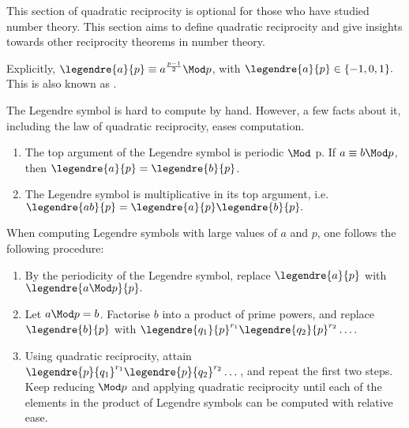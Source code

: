 \documentclass[a4paper, 12pt,oneside,openany]{book}
\begin{document}
This section of quadratic reciprocity is optional for those who have studied number theory. This section aims to define quadratic reciprocity and give insights towards other reciprocity theorems in number theory. 



Explicitly, $\legendre{a}{p}\equiv a^{\frac{p-1}{2}} \Mod p$, with $\legendre{a}{p} \in \{-1, 0, 1\}.$ This is also known as .

The Legendre symbol is hard to compute by hand. However, a few facts about it, including the law of quadratic reciprocity, eases computation.

\begin{enumerate}
	\item The top argument of the Legendre symbol is periodic $\Mod$ p. If $a\equiv b\Mod p$, then $\legendre{a}{p}=\legendre{b}{p}$.
	\item The Legendre symbol is multiplicative in its top argument, i.e. $\legendre{ab}{p}=\legendre{a}{p}\legendre{b}{p}.$
\end{enumerate}


When computing Legendre symbols with large values of $a$ and $p$, one follows the following procedure:

\begin{enumerate}
	\item By the periodicity of the Legendre symbol, replace $\legendre{a}{p}$ with $\legendre{a \Mod p}{p}.$
	\item Let $a\Mod p = b$. Factorise $b$ into a product of prime powers, and replace $\legendre{b}{p}$ with $\legendre{q_1}{p}^{r_1}\legendre{q_2}{p}^{r_2}\dots.$
	\item Using quadratic reciprocity, attain $\legendre{p}{q_1}^{r_1}\legendre{p}{q_2}^{r_2}\dots$, and repeat the first two steps. Keep reducing $\Mod p$ and applying quadratic reciprocity until each of the elements in the product of Legendre symbols can be computed with relative ease.
\end{enumerate}
\end{document}
